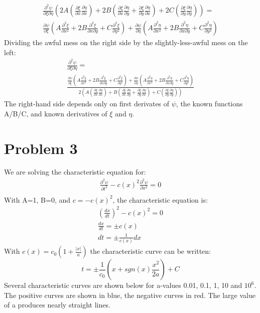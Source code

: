 \documentclass[a4paper,10pt]{article}
\numberwithin{equation}{section}
\begin{document}
\begin{multline}
\frac{\partial ^2 \psi}{\partial \xi \partial \eta}(2A(\frac{\partial \xi}{\partial x}\frac{\partial \eta}{\partial x})
+2B(\frac{\partial \xi}{\partial x}\frac{\partial \eta}{\partial y}+\frac{\partial \xi}{\partial y}\frac{\partial \eta}{\partial x})
+2C(\frac{\partial \xi}{\partial y}\frac{\partial \eta}{\partial y}))=\\
\frac{\partial \psi}{\partial \xi}(A\frac{\partial ^2 \xi}{\partial x^2}+2B\frac{\partial ^2 \xi}{\partial x \partial y}+C\frac{\partial ^2 \xi}{\partial y^2})+
\frac{\partial \psi}{\partial \eta}(A\frac{\partial ^2 \eta}{\partial x^2}+2B\frac{\partial ^2 \eta}{\partial x \partial y}+C\frac{\partial ^2 \eta}{\partial y^2})
\end{multline}
Dividing the awful mess on the right side by the slightly-less-awful mess on the left:
\begin{multline}
\frac{\partial ^2 \psi}{\partial \xi \partial \eta}=\\
\frac{\frac{\partial \psi}{\partial \xi}(A\frac{\partial ^2 \xi}{\partial x^2}+2B\frac{\partial ^2 \xi}{\partial x \partial y}+C\frac{\partial ^2 \xi}{\partial y^2})+
\frac{\partial \psi}{\partial \eta}(A\frac{\partial ^2 \eta}{\partial x^2}+2B\frac{\partial ^2 \eta}{\partial x \partial y}+C\frac{\partial ^2 \eta}{\partial y^2})}
{2(A(\frac{\partial \xi}{\partial x}\frac{\partial \eta}{\partial x})
+B(\frac{\partial \xi}{\partial x}\frac{\partial \eta}{\partial y}+\frac{\partial \xi}{\partial y}\frac{\partial \eta}{\partial x})
+C(\frac{\partial \xi}{\partial y}\frac{\partial \eta}{\partial y}))}
\end{multline}
The right-hand side depends only on first derivates of $\psi$, the known functions A/B/C, and known derivatives of $\xi$ and $\eta$.

\section{Problem 3}
We are solving the characteristic equation for:
\begin{gather*}
 \frac{\partial ^2\psi}{\partial t^2}-c(x)^2\frac{\partial ^2 \psi}{\partial x^2}=0\\
\end{gather*}
With A=1, B=0, and $c=-c(x)^2$, the characteristic equation is:
\begin{gather}
(\frac{dx}{dt})^2-c(x)^2=0\\
\frac{dx}{dt}=\pm c(x)\\
dt=\pm\frac{1}{c(x)}dx
\end{gather}
With $c(x)=c_0(1+\frac{|x|}{a})$ the characteristic curve can be written:
\begin{equation}
t=\pm\frac{1}{c_0}(x+sgn(x)\frac{x^2}{2a})+C
\end{equation}
Several characteristic curves are shown below for a-values 0.01, 0.1, 1, 10 and $10^{6}$. 
The positive curves are shown in blue, the negative curves in red.
The large value of a produces nearly straight lines.
\end{document}
